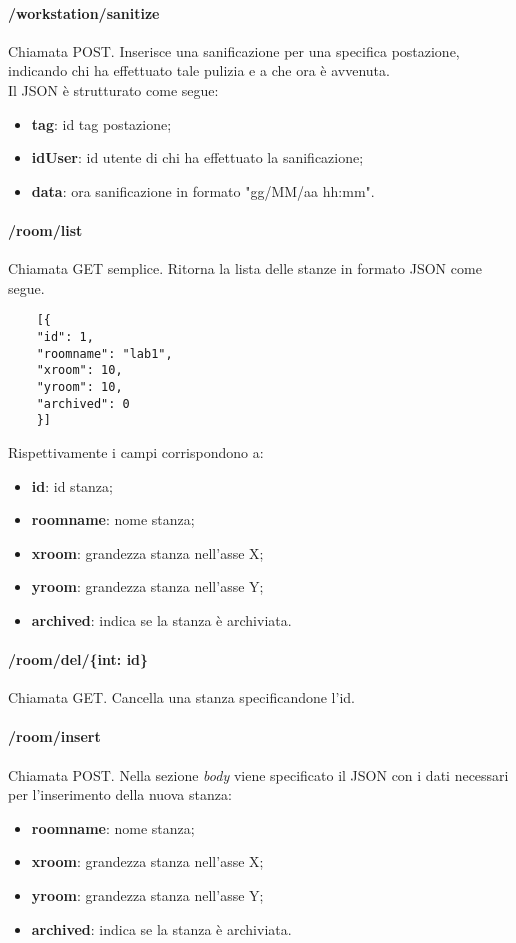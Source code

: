 \paragraph{/workstation/sanitize}
Chiamata POST. Inserisce una sanificazione per una specifica postazione, indicando chi ha effettuato tale pulizia e a che ora è avvenuta.\\
Il JSON è strutturato come segue:
\begin{itemize}
	\item \textbf{tag}: id tag postazione;
	\item \textbf{idUser}: id utente di chi ha effettuato la sanificazione;
	\item \textbf{data}: ora sanificazione in formato "gg/MM/aa hh:mm".
\end{itemize}
\paragraph{/room/list}
Chiamata GET semplice. Ritorna la lista delle stanze in formato JSON come segue.	\\
\begin{center}
	\begin{lstlisting}
	[{
	"id": 1,
	"roomname": "lab1",
	"xroom": 10,
	"yroom": 10,
	"archived": 0
	}]
	\end{lstlisting}
\end{center}
Rispettivamente i campi corrispondono a:
\begin{itemize}
	\item \textbf{id}: id stanza;
	\item \textbf{roomname}: nome stanza;
	\item \textbf{xroom}: grandezza stanza nell'asse X;
	\item \textbf{yroom}: grandezza stanza nell'asse Y;
	\item \textbf{archived}: indica se la stanza è archiviata.	
\end{itemize}
\paragraph{/room/del/\{int: id\}}
Chiamata GET. Cancella una stanza specificandone l'id.
\paragraph{/room/insert}
Chiamata POST. Nella sezione \textit{body} viene specificato il JSON con i dati necessari per l'inserimento della nuova stanza:
\begin{itemize}
	\item \textbf{roomname}: nome stanza;
	\item \textbf{xroom}: grandezza stanza nell'asse X;
	\item \textbf{yroom}: grandezza stanza nell'asse Y;
	\item \textbf{archived}: indica se la stanza è archiviata.		
\end{itemize}

